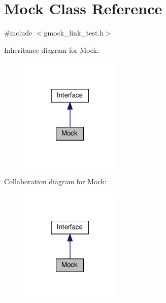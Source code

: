\hypertarget{classMock}{}\section{Mock Class Reference}
\label{classMock}


{\ttfamily \#include $<$gmock\+\_\+link\+\_\+test.\+h$>$}



Inheritance diagram for Mock\+:\nopagebreak
\begin{figure}[H]
\begin{center}
\leavevmode
\includegraphics[width=135pt]{classMock__inherit__graph}
\end{center}
\end{figure}


Collaboration diagram for Mock\+:\nopagebreak
\begin{figure}[H]
\begin{center}
\leavevmode
\includegraphics[width=135pt]{classMock__coll__graph}
\end{center}
\end{figure}
